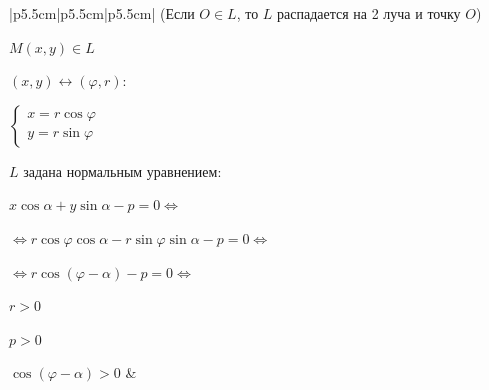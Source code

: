\begin{center}
\begin{longtable}[t]{|p{5.5cm}|p{5.5cm}|p{5.5cm}|}
        (Если \(O \in L\), то \(L\) распадается на 2 луча и точку \(O\))

        \(M(x, y) \in L\)

        \((x, y) \leftrightarrow (\varphi, r)\):

        \(
        \begin{cases}
            x = r \cos \varphi \\
            y = r \sin \varphi
        \end{cases}
        \)

        \(L\) задана нормальным уравнением:

        \small\(x \cos \alpha + y \sin \alpha - p = 0 \Leftrightarrow\)

        \scriptsize\(\Leftrightarrow r \cos \varphi \cos \alpha - r \sin \varphi \sin \alpha - p = 0 \Leftrightarrow\)

        \small\(\Leftrightarrow r \cos (\varphi - \alpha) - p = 0 \Leftrightarrow\)\normalsize


        \(r > 0\)

        \(p > 0\)

        \(\cos(\varphi - \alpha) > 0\)
         &
        \multicolumn{2}{p{11cm}}{

        Взаимное расположение прямой и плоскости в пространстве:

        \(\alpha: Ax + By + Cz + D = 0\), \(A^2 + B^2 + C^2 \neq 0\)

        \(L: \vec s = (l, m, n), M_0(x_0, y_0, z_0)\)

        \textbullet \(
        \left[\begin{array}{ll}
                  L \parallel \alpha \\
                  L \subset \alpha
              \end{array}\right .\)
        \(\Leftrightarrow \vec s \perp \vec N \Leftrightarrow \vec s \cdot \vec N = 0 \Leftrightarrow\)

        \(\)

        \(\Leftrightarrow Al + Bm + Cn = 0\)

        \textbullet \(L \subset \alpha \Leftrightarrow\)
        \(\begin{cases}
              \vec s \cdot \vec N = 0 \\
              M_0 \in \alpha
          \end{cases} \Leftrightarrow\)

}
\end{longtable}
\end{center}
